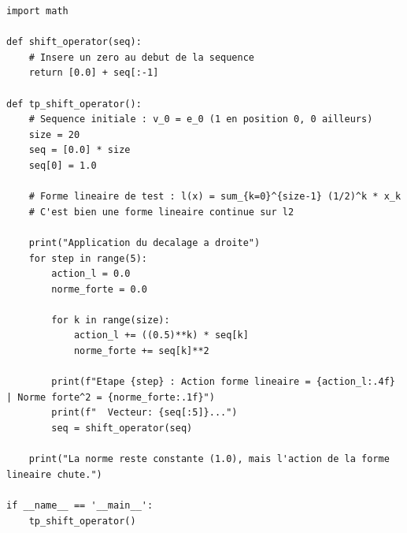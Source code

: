 \documentclass[11pt,a4paper]{article}
\begin{document}
\begin{lstlisting}
import math

def shift_operator(seq):
    # Insere un zero au debut de la sequence
    return [0.0] + seq[:-1]

def tp_shift_operator():
    # Sequence initiale : v_0 = e_0 (1 en position 0, 0 ailleurs)
    size = 20
    seq = [0.0] * size
    seq[0] = 1.0

    # Forme lineaire de test : l(x) = sum_{k=0}^{size-1} (1/2)^k * x_k
    # C'est bien une forme lineaire continue sur l2

    print("Application du decalage a droite")
    for step in range(5):
        action_l = 0.0
        norme_forte = 0.0

        for k in range(size):
            action_l += ((0.5)**k) * seq[k]
            norme_forte += seq[k]**2

        print(f"Etape {step} : Action forme lineaire = {action_l:.4f} | Norme forte^2 = {norme_forte:.1f}")
        print(f"  Vecteur: {seq[:5]}...")
        seq = shift_operator(seq)

    print("La norme reste constante (1.0), mais l'action de la forme lineaire chute.")

if __name__ == '__main__':
    tp_shift_operator()
\end{lstlisting}
\end{document}
